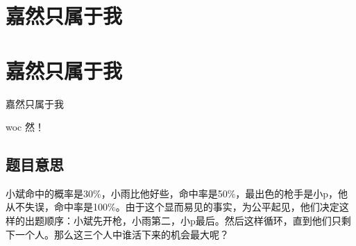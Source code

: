 \def\sectionName{嘉然只属于我}



\isBeamerMode\relax
    \section[\TOCName]{\sectionName}
\fi
\isBeamerMode\relax
    \section[\TOCName\ -\ \sectionName]{\sectionName}
\fi

\begin{frame}

\isBeamerMode\relax
    {\Huge \sectionName}\par
\fi




woc 然！



\end{frame}

\subsection{题目意思}
\begin{frame} %
小斌命中的概率是30\%，小雨比他好些，命中率是50\%，最出色的枪手是小p，他从不失误，命中率是100\%。由于这个显而易见的事实，为公平起见，他们决定这样的出题顺序：小斌先开枪，小雨第二，小p最后。然后这样循环，直到他们只剩下一个人。那么这三个人中谁活下来的机会最大呢？
\end{frame}



